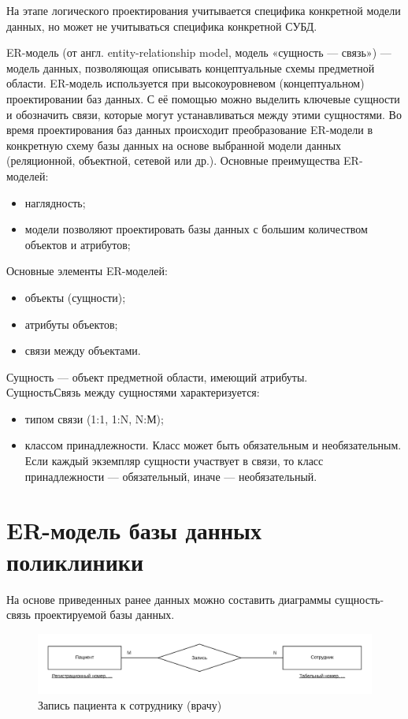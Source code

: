 \documentclass[14pt,a4paper,russian]{extreport}
\begin{document}
На этапе логического проектирования учитывается специфика конкретной модели данных, но может
не учитываться специфика конкретной СУБД. 

ER-модель (от англ. entity-relationship model, модель «сущность — связь») — модель данных,
позволяющая описывать концептуальные схемы предметной области.  ER-модель используется при
высокоуровневом (концептуальном) проектировании баз данных. С её помощью можно выделить ключевые
сущности и обозначить связи, которые могут устанавливаться между этими сущностями.  Во время
проектирования баз данных происходит преобразование ER-модели в конкретную схему базы
данных на основе выбранной модели данных (реляционной, объектной, сетевой или др.).\cite{dbdesign}
\newpage
\noindent Основные преимущества ER-моделей:
\begin{itemize}[noitemsep]
    \item наглядность; 
    \item модели позволяют проектировать базы данных с большим количеством объектов и
        атрибутов;
\end{itemize}

\noindent Основные элементы ER-моделей:
\begin{itemize}[noitemsep]
    \item объекты (сущности);
    \item атрибуты объектов;
    \item связи между объектами.
\end{itemize}
\noindent Сущность — объект предметной области, имеющий атрибуты.\\
\noindent СущностьСвязь между сущностями характеризуется:
\begin{itemize}[noitemsep]
    \item типом связи (1:1, 1:N, N:М); 
    \item классом принадлежности. Класс может быть
        обязательным и необязательным. Если каждый экземпляр сущности участвует
        в связи, то класс принадлежности — обязательный, иначе — необязательный.
\end{itemize}


\section{ER-модель базы данных поликлиники}
На основе приведенных ранее данных можно составить диаграммы сущность-связь проектируемой базы
данных.

\begin{figure}[h!]
        \includegraphics[width=\textwidth]{patappemp}
        \caption{Запись пациента к сотруднику (врачу)}
        \label{fig:patappemp}
\end{figure}
\end{document}
